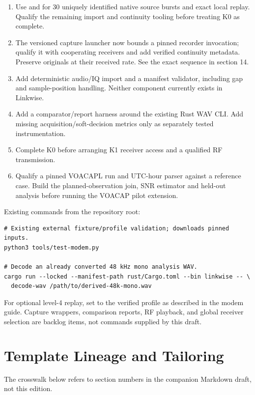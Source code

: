 \documentclass[11pt,a4paper]{article}
\begin{document}
\begin{enumerate}
\item Use  and  for 30 uniquely identified native source bursts and exact local replay. Qualify the remaining import and continuity tooling before treating K0 as complete.
\item The versioned capture launcher now bounds a pinned recorder invocation; qualify it with cooperating receivers and add verified continuity metadata. Preserve originals at their received rate. See the exact sequence in section 14.
\item Add deterministic audio/IQ import and a manifest validator, including gap and sample-position handling. Neither component currently exists in Linkwise.
\item Add a comparator/report harness around the existing Rust WAV CLI. Add missing acquisition/soft-decision metrics only as separately tested instrumentation.
\item Complete K0 before arranging K1 receiver access and a qualified RF transmission.
\item Qualify a pinned VOACAPL run and UTC-hour parser against a reference case. Build the planned-observation join, SNR estimator and held-out analysis before running the VOACAP pilot extension.
\end{enumerate}
Existing commands from the repository root:

\begin{lstlisting}
# Existing external fixture/profile validation; downloads pinned inputs.
python3 tools/test-modem.py

# Decode an already converted 48 kHz mono analysis WAV.
cargo run --locked --manifest-path rust/Cargo.toml --bin linkwise -- \
  decode-wav /path/to/derived-48k-mono.wav
\end{lstlisting}
For optional level-4 replay, set  to the verified profile as described in the modem guide. Capture wrappers, comparison reports, RF playback, and global receiver selection are backlog items, not commands supplied by this draft.


\section{Template Lineage and Tailoring}
\label{app:tailoring}

The crosswalk below refers to section numbers in the companion Markdown draft, not this edition.
\end{document}
